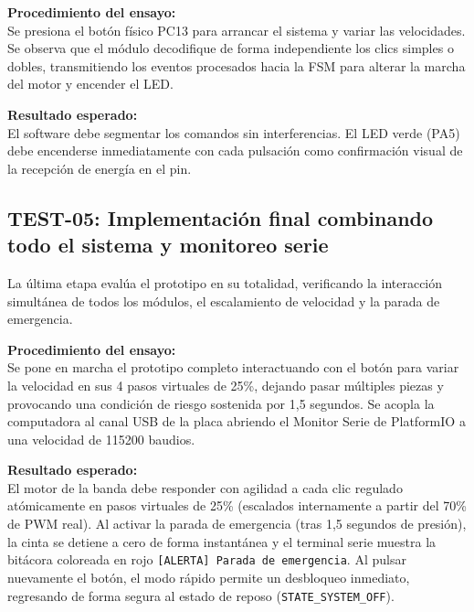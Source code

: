 \documentclass[12pt, letterpaper]{article}
\begin{document}
\vspace{0.5cm}

\noindent \textbf{Procedimiento del ensayo:} \\
Se presiona el botón físico PC13 para arrancar el sistema y variar las velocidades. Se observa que el módulo decodifique de forma independiente los clics simples o dobles, transmitiendo los eventos procesados hacia la FSM para alterar la marcha del motor y encender el LED.

\vspace{0.5cm}

\noindent \textbf{Resultado esperado:} \\
El software debe segmentar los comandos sin interferencias. El LED verde (PA5) debe encenderse inmediatamente con cada pulsación como confirmación visual de la recepción de energía en el pin.

\subsection{TEST-05: Implementación final combinando todo el sistema y monitoreo serie}
La última etapa evalúa el prototipo en su totalidad, verificando la interacción simultánea de todos los módulos, el escalamiento de velocidad y la parada de emergencia.

\vspace{0.5cm}

\noindent \textbf{Procedimiento del ensayo:} \\
Se pone en marcha el prototipo completo interactuando con el botón para variar la velocidad en sus 4 pasos virtuales de 25\%, dejando pasar múltiples piezas y provocando una condición de riesgo sostenida por 1,5 segundos. Se acopla la computadora al canal USB de la placa abriendo el Monitor Serie de PlatformIO a una velocidad de 115200 baudios.

\vspace{0.5cm}

\noindent \textbf{Resultado esperado:} \\
El motor de la banda debe responder con agilidad a cada clic regulado atómicamente en pasos virtuales de 25\% (escalados internamente a partir del 70\% de PWM real). Al activar la parada de emergencia (tras 1,5 segundos de presión), la cinta se detiene a cero de forma instantánea y el terminal serie muestra la bitácora coloreada en rojo \texttt{[ALERTA] Parada de emergencia}. Al pulsar nuevamente el botón, el modo rápido permite un desbloqueo inmediato, regresando de forma segura al estado de reposo (\texttt{STATE\_SYSTEM\_OFF}).
\end{document}
